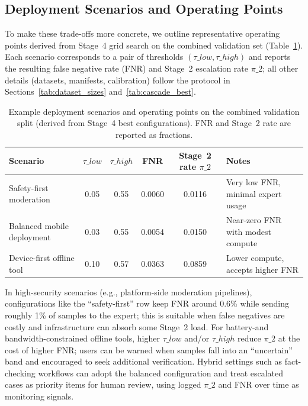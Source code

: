 \subsection*{Deployment Scenarios and Operating Points}
To make these trade\hyp offs more concrete, we outline representative operating points derived from Stage~4 grid search on the combined validation set (Table~\ref{tab:deployment_scenarios}). Each scenario corresponds to a pair of thresholds $(\tau\_{low},\tau\_{high})$ and reports the resulting false negative rate (FNR) and Stage~2 escalation rate $\pi\_2$; all other details (datasets, manifests, calibration) follow the protocol in Sections~\ref{tab:dataset_sizes} and~\ref{tab:cascade_best}.
\begin{table}[h]
  \centering
  \caption{Example deployment scenarios and operating points on the combined validation split (derived from Stage~4 best configurations). FNR and Stage~2 rate are reported as fractions.}
  \label{tab:deployment_scenarios}
  {\scriptsize
  \setlength{\tabcolsep}{4pt}
  \begin{tabular}{@{}lccccp{}@{}}
    \toprule
    Scenario & $\tau\_{low}$ & $\tau\_{high}$ & FNR & Stage~2 rate $\pi\_2$ & Notes \\
    \midrule
    Safety\hyp first moderation & 0.05 & 0.55 & 0.0060 & 0.0116 & Very low FNR, minimal expert usage \\
    Balanced mobile deployment & 0.03 & 0.55 & 0.0054 & 0.0150 & Near\hyp zero FNR with modest compute \\
    Device\hyp first offline tool & 0.10 & 0.57 & 0.0363 & 0.0859 & Lower compute, accepts higher FNR \\
    \bottomrule
  \end{tabular}}
\end{table}
In high\hyp security scenarios (e.g., platform\hyp side moderation pipelines), configurations like the ``safety\hyp first'' row keep FNR around 0.6\% while sending roughly 1\% of samples to the expert; this is suitable when false negatives are costly and infrastructure can absorb some Stage~2 load. For battery\hyp and bandwidth\hyp constrained offline tools, higher $\tau\_{low}$ and/or $\tau\_{high}$ reduce $\pi\_2$ at the cost of higher FNR; users can be warned when samples fall into an ``uncertain'' band and encouraged to seek additional verification. Hybrid settings such as fact\hyp checking workflows can adopt the balanced configuration and treat escalated cases as priority items for human review, using logged $\pi\_2$ and FNR over time as monitoring signals.

